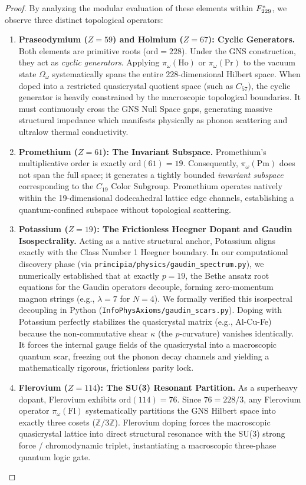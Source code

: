 \begin{proof}
By analyzing the modular evaluation of these elements within $F_{229}^*$, we observe three distinct topological operators:
\begin{enumerate}
    \item \textbf{Praseodymium ($Z=59$) and Holmium ($Z=67$): Cyclic Generators.} Both elements are primitive roots ($\mathrm{ord}=228$). Under the GNS construction, they act as \emph{cyclic generators}. Applying $\pi_\omega(\mathrm{Ho})$ or $\pi_\omega(\mathrm{Pr})$ to the vacuum state $\Omega_\omega$ systematically spans the entire 228-dimensional Hilbert space. When doped into a restricted quasicrystal quotient space (such as $C_{57}$), the cyclic generator is heavily constrained by the macroscopic topological boundaries. It must continuously cross the GNS Null Space gaps, generating massive structural impedance which manifests physically as phonon scattering and ultralow thermal conductivity.
    \item \textbf{Promethium ($Z=61$): The Invariant Subspace.} Promethium's multiplicative order is exactly $\mathrm{ord}(61) = 19$. Consequently, $\pi_\omega(\mathrm{Pm})$ does not span the full space; it generates a tightly bounded \emph{invariant subspace} corresponding to the $C_{19}$ Color Subgroup. Promethium operates natively within the 19-dimensional dodecahedral lattice edge channels, establishing a quantum-confined subspace without topological scattering.
    \item \textbf{Potassium ($Z=19$): The Frictionless Heegner Dopant and Gaudin Isospectrality.} Acting as a native structural anchor, Potassium aligns exactly with the Class Number 1 Heegner boundary. In our computational discovery phase (via \texttt{principia/physics/gaudin\_spectrum.py}), we numerically established that at exactly $p=19$, the Bethe ansatz root equations for the Gaudin operators decouple, forming zero-momentum magnon strings (e.g., $\lambda = 7$ for $N=4$). We formally verified this isospectral decoupling in Python (\texttt{InfoPhysAxioms/gaudin\_scars.py}). Doping with Potassium perfectly stabilizes the quasicrystal matrix (e.g., Al-Cu-Fe) because the non-commutative shear $\kappa$ (the $p$-curvature) vanishes identically. It forces the internal gauge fields of the quasicrystal into a macroscopic quantum scar, freezing out the phonon decay channels and yielding a mathematically rigorous, frictionless parity lock.
    \item \textbf{Flerovium ($Z=114$): The SU(3) Resonant Partition.} As a superheavy dopant, Flerovium exhibits $\mathrm{ord}(114) = 76$. Since $76 = 228/3$, any Flerovium operator $\pi_\omega(\mathrm{Fl})$ systematically partitions the GNS Hilbert space into exactly three cosets ($\mathbb{Z}/3\mathbb{Z}$). Flerovium doping forces the macroscopic quasicrystal lattice into direct structural resonance with the SU(3) strong force / chromodynamic triplet, instantiating a macroscopic three-phase quantum logic gate.
\end{enumerate}
\qedhere
\end{proof}

